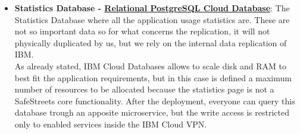 \begin{itemize}
	\item \textbf{Statistics Database - \href{https://cloud.ibm.com/catalog/services/databases-for-postgresql}{Relational PostgreSQL Cloud Database}}: The Statistics Database where all the application usage statistics are. 
	These are not so important data so for what concerns the replication, it will not physically duplicated by us, but we rely on the internal data replication of IBM.
	\\As already stated, IBM Cloud Databases allows to scale disk and RAM to best fit the application requirements, but in this case is defined a maximum number of resources to be allocated because the statistics page is not a SafeStreets core functionality.
	After the deployment, everyone can query this database trough an apposite microservice, but the write access is restricted only to enabled services inside the IBM Cloud VPN.
	\begin{comment}
	\begin{figure}[h!]
	\makebox[\textwidth]{\texttt{[image: /images/microservices/postgres.png]}}
	\caption{Scalable SafeStreets architecture to handle millions of users.}
	\end{figure}
	\FloatBarrier
	\end{comment}
	
	
	
\end{itemize}